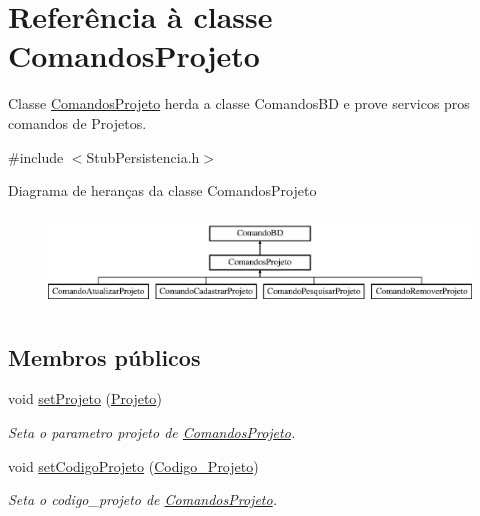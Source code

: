 \hypertarget{class_comandos_projeto}{
\section{\-Referência à classe \-Comandos\-Projeto}
\label{class_comandos_projeto}
}


\-Classe \hyperlink{class_comandos_projeto}{\-Comandos\-Projeto} herda a classe \-Comandos\-B\-D e prove servicos pros comandos de \-Projetos.  




{\ttfamily \#include $<$\-Stub\-Persistencia.\-h$>$}

\-Diagrama de heranças da classe \-Comandos\-Projeto\begin{figure}[H]
\begin{center}
\leavevmode
\includegraphics[height=2.485207cm]{class_comandos_projeto}
\end{center}
\end{figure}
\subsection*{\-Membros públicos}
\begin{DoxyCompactItemize}
\item 
void \hyperlink{class_comandos_projeto_a51f9691b4e474249bba632903639bbd8}{set\-Projeto} (\hyperlink{class_projeto}{\-Projeto})
\begin{DoxyCompactList}\small\item\em \-Seta o parametro projeto de \hyperlink{class_comandos_projeto}{\-Comandos\-Projeto}. \end{DoxyCompactList}\item 
void \hyperlink{class_comandos_projeto_a227b7af93fcca27d5c98c19e10eeda97}{set\-Codigo\-Projeto} (\hyperlink{class_codigo___projeto}{\-Codigo\-\_\-\-Projeto})
\begin{DoxyCompactList}\small\item\em \-Seta o codigo\-\_\-projeto de \hyperlink{class_comandos_projeto}{\-Comandos\-Projeto}. \end{DoxyCompactList}\end{DoxyCompactItemize}

